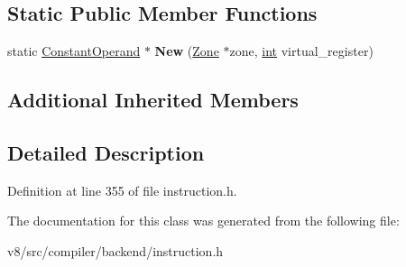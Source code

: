 \subsection*{Static Public Member Functions}
\begin{DoxyCompactItemize}
\item 
\mbox{\label{classv8_1_1internal_1_1compiler_1_1ConstantOperand_a39e76be0338ef8835f22f2c05c82c6be}} 
static \mbox{\hyperlink{classv8_1_1internal_1_1compiler_1_1ConstantOperand}{Constant\+Operand}} $\ast$ {\bfseries New} (\mbox{\hyperlink{classv8_1_1internal_1_1Zone}{Zone}} $\ast$zone, \mbox{\hyperlink{classint}{int}} virtual\+\_\+register)
\end{DoxyCompactItemize}
\subsection*{Additional Inherited Members}


\subsection{Detailed Description}


Definition at line 355 of file instruction.\+h.



The documentation for this class was generated from the following file\+:\begin{DoxyCompactItemize}
\item 
v8/src/compiler/backend/instruction.\+h\end{DoxyCompactItemize}
